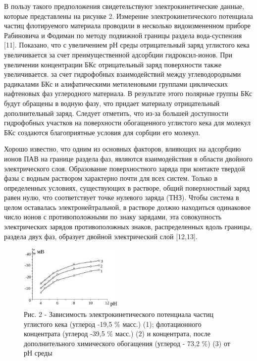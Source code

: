 \begin{multicols}{2}
В пользу такого предположения свидетельствуют электрокинетические
данные, которые представлены на рисунке 2. Измерение
электрокинетического потенциала частиц флотируемого материала проводили
в несколько видоизмененном приборе Рабиновича и Фодиман по методу
подвижной границы раздела вода-суспензия {[}11{]}. Показано, что с
увеличением рН среды отрицательный заряд углистого кека увеличивается за
счет преимущественной адсорбции гидроксил-ионов. При увеличении
концентрации БКс отрицательный заряд поверхности также увеличивается. за
счет гидрофобных взаимодействий между углеводородными радикалами БКс и
алифатическими метиленовыми группами циклических нафтеновых фаз
углеродного материала. В результате этого полярные группы БКс будут
обращены в водную фазу, что придает материалу отрицательный
дополнительный заряд. Следует отметить, что из-за большей доступности
гидрофобных участков на поверхности обогащенного углистого кека для
молекул БКс создаются благоприятные условия для сорбции его молекул.

Хорошо известно, что одним из основных факторов, влияющих на адсорбцию
ионов ПАВ на границе раздела фаз, являются взаимодействия в области
двойного электрического слоя. Образование поверхностного заряда при
контакте твердой фазы с водным раствором характерно почти для всех
систем. Только в определенных условиях, существующих в растворе, общий
поверхностный заряд равен нулю, что соответствует точке нулевого заряда
(ТНЗ). Чтобы система в целом оставалась электронейтральной, в растворе
должно находиться одинаковое число ионов с противоположными по знаку
зарядами, эта совокупность электрических зарядов противоположных знаков,
распределенных вдоль границы, раздела двух фаз, образует двойной
электрический слой {[}12,13{]}.
\end{multicols}

\begin{figure}[H]
	\centering
	\includegraphics[width=0.45\textwidth]{assets/1035}
	\caption*{Рис. 2 - Зависимость электрокинетического потенциала частиц углистого кека (углерод -19,5 \% масс.) (1); флотационного концентрата (углерод -39,5 \% масс.) (2) и концентрата, после дополнительного химического обогащения (углерод - 73,2 \%) (3) от рН среды}
\end{figure}

